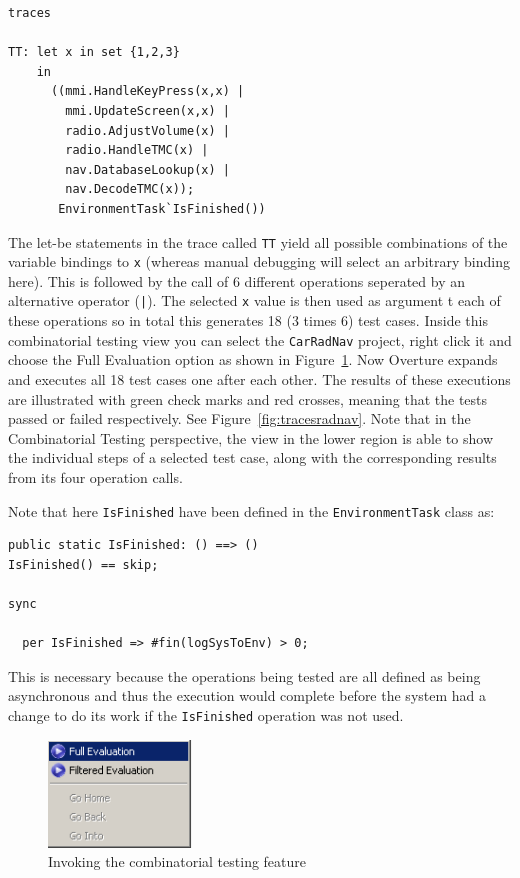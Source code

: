 \begin{lstlisting}
traces

TT: let x in set {1,2,3}
    in
      ((mmi.HandleKeyPress(x,x) | 
        mmi.UpdateScreen(x,x) | 
        radio.AdjustVolume(x) |
        radio.HandleTMC(x) |
        nav.DatabaseLookup(x) |
        nav.DecodeTMC(x));
       EnvironmentTask`IsFinished())
 \end{lstlisting}

\noindent The let-be statements in the trace called
\texttt{TT} yield all possible combinations of the variable
bindings to \texttt{x} (whereas manual debugging will select an
arbitrary binding here). This is followed by the call of 6 different
operations seperated by an alternative operator (\texttt{|}). The
selected \texttt{x} value is then used as argument t each of these
operations so in total this generates 18 (3 times 6) test cases. 
Inside this combinatorial testing view you can
select the \texttt{CarRadNav} project, right click it and 
choose the \textsf{Full
  Evaluation} option as shown in Figure~\ref{fig:CToptions}. 
Now Overture expands
and executes all 18 test cases one after each other. The results of these
executions are illustrated with green check marks and red crosses, meaning that
the tests passed or failed respectively. See Figure~\ref{fig:tracesradnav}. Note
that in the Combinatorial Testing perspective, the view in the lower region is
able to show the individual steps of a selected test case, along with the
corresponding results from its four operation calls.

Note that here \texttt{IsFinished} have been defined in the
\texttt{EnvironmentTask} class as:

\begin{lstlisting}
public static IsFinished: () ==> ()
IsFinished() == skip;

sync

  per IsFinished => #fin(logSysToEnv) > 0;
\end{lstlisting}
This is necessary because the operations being tested are all defined
as being asynchronous and thus the execution would complete before the
system had a change to do its work if the \texttt{IsFinished}
operation was not used.

\begin{figure}[htbp]
\begin{center}
\includegraphics[width=1.5in]{figures/CToptions}
\caption{Invoking the combinatorial testing feature\label{fig:CToptions}}
\end{center}
\end{figure}

